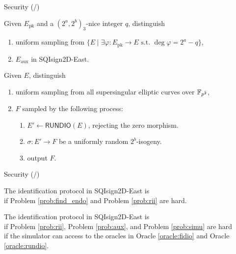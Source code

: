 \begin{frame}{Security (/\securitytotal{})}
    \begin{prob}\label{prob:aux}
        Given $E_\mathrm{pk}$ and a $(2^a, 2^b)_3$-nice integer $q$, distinguish
        \begin{enumerate}
            \item uniform sampling from $\{E \mid \exists\varphi: E_\mathrm{pk} \to E \text{ s.t. } \deg\varphi = 2^a - q\}$,
            \item $E_\mathrm{aux}$ in SQIsign2D-East.
        \end{enumerate}
    \end{prob}

    \vspace{5pt}
    \begin{prob}\label{prob:simu}
        Given $E$, distinguish
        \begin{enumerate}
            \item uniform sampling from all supersingular elliptic curves over $\mathbb{F}_{p^2}$,
            \item $F$ sampled by the following process:
            \begin{enumerate}
                \normalsize
                \item $E' \leftarrow \textsf{RUNDIO}(E)$, rejecting the zero morphism.
                \item $\sigma : E' \to F$ be a uniformly random $2^b$-isogeny.
                \item output $F$.
            \end{enumerate}
        \end{enumerate}
    \end{prob}
\end{frame}

\begin{frame}{Security (/\securitytotal{})}
    \begin{theorem}[Soundness]
        The identification protocol in SQIsign2D-East is
        \\
        if Problem \ref{prob:find_endo} and Problem \ref{prob:rii} are hard.
    \end{theorem}

    \vspace{10pt}
    \begin{theorem}
        The identification protocol in SQIsign2D-East is \\
        if Problem \ref{prob:rii}, Problem \ref{prob:aux}, and Problem \ref{prob:simu} are hard\\
        if the simulator can access to the oracles in Oracle \ref{oracle:fidio} and Oracle \ref{oracle:rundio}.
    \end{theorem}
\end{frame}

